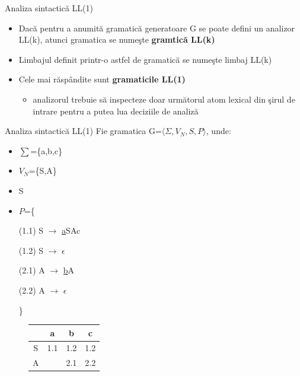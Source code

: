 \documentclass[pdf]{beamer}
\begin{document}
\begin{frame}{Analiza sintactică LL(1)}
\begin{itemize}
\item
Dacă pentru a anumită gramatică generatoare G se poate defini un analizor LL(k), atunci gramatica se numeşte \textbf{gramtică LL(k)}

\item 
Limbajul definit printr-o astfel de gramatică se numeşte limbaj LL(k)

\item
Cele mai răspândite sunt \textbf{gramaticile LL(1)}
\begin{itemize}
\item
analizorul trebuie să inspecteze doar următorul atom lexical din şirul de intrare pentru a putea lua deciziile de analiză
\end{itemize}
\end{itemize}
\end{frame}



\begin{frame}{Analiza sintactică LL(1)}
Fie gramatica G=$\langle \Sigma, V_N, S, P \rangle$, unde:

\begin{itemize}
\item
$\sum$=\{a,b,c\}
\item
$V_N$=\{S,A\}
\item
S
\item
$P$=\{

\hspace{1cm} (1.1) S $\rightarrow$ \underline{a}SAc

\hspace{1cm} (1.2) S $\rightarrow$ \underline{$\epsilon$}

\hspace{1cm} (2.1) A $\rightarrow$ \underline{b}A

\hspace{1cm} (2.2) A $\rightarrow$ \underline{$\epsilon$}

\}
\end{itemize}

\begin{figure}[H]
\centering
\begin{tabular}{ | c | c |  c |  c |}
\hline
& a & b & c \\ [0.5ex] 
 \hline
 S & 1.1 & 1.2 & 1.2\\
 A & & 2.1 & 2.2\\
 \hline
 \end{tabular}
\end{figure}
\end{frame}
\end{document}
